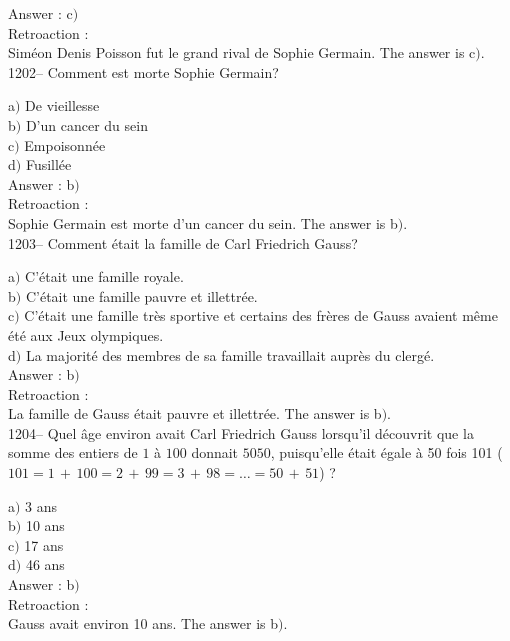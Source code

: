 ﻿\documentclass[letterpaper, 12pt]{article}
\begin{document}
Answer : c$)$\\

Retroaction : \\
Sim\'eon Denis Poisson fut le grand rival de Sophie Germain.
The answer is c$)$.\\

1202-- Comment est morte Sophie Germain?

a$)$ De vieillesse \\
b$)$ D'un cancer du sein \\
c$)$ Empoisonn\'ee \\
d$)$ Fusill\'ee\\

Answer : b$)$\\

Retroaction : \\
Sophie Germain est morte d'un cancer du sein.
The answer is b$)$.\\

1203-- Comment \'etait la famille de Carl Friedrich Gauss?

a$)$ C'\'etait une famille royale. \\
b$)$ C'\'etait une famille pauvre et illettr\'ee. \\
c$)$ C'\'etait une famille tr\`es sportive et certains des fr\`eres de Gauss
avaient m\^eme \'et\'e aux Jeux olympiques. \\
d$)$ La majorit\'e des membres de sa famille travaillait aupr\`es du
clerg\'e.\\

Answer : b$)$\\

Retroaction : \\
La famille de Gauss \'etait pauvre et illettr\'ee.
The answer is b$)$.\\

1204-- Quel \^age environ avait Carl Friedrich Gauss lorsqu'il
d\'ecouvrit que la somme des entiers de $1$ \`a $100$ donnait
$5050$, puisqu'elle \'etait \'egale \`a 50 fois 101
($101=1\,+\,100=2\,+\,99=3\,+\,98=\ldots=50\,+\,51$) ?

a$)$ 3 ans \\
b$)$ 10 ans \\
c$)$ 17 ans \\
d$)$ 46 ans\\

Answer : b$)$\\

Retroaction : \\
Gauss avait environ 10 ans.
The answer is b$)$.\\
\end{document}
